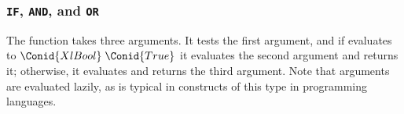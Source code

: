\resethooks

\subsubsection{\texttt{IF}, \texttt{AND}, and \texttt{OR}}

The  function takes three arguments. It tests the first argument, and if evaluates
to \ensuremath{\Conid{XlBool}\;\Conid{True}} it evaluates the second argument and returns it; otherwise, it
evaluates and returns the third argument. Note that arguments are evaluated lazily,
as is typical in constructs of this type in programming languages.

